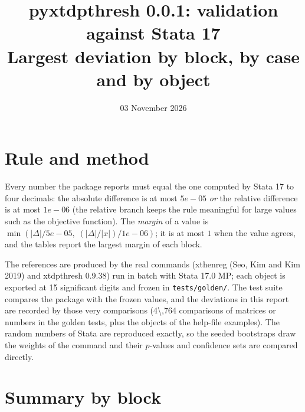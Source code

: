 \documentclass[10.5pt,a4paper]{article}
\title{\textbf{pyxtdpthresh 0.0.1: validation against Stata 17}\\[2pt]\large Largest deviation by block, by case and by object}
\author{}
\date{03 November 2026}
\newcommand{\code}[1]{\texttt{#1}}
\begin{document}
\maketitle

\section{Rule and method}

Every number the package reports must equal the one computed by Stata 17 to four
decimals: the absolute difference is at most $5e-05$ \emph{or} the relative difference is at
most $1e-06$ (the relative branch keeps the rule meaningful for large values such as the
objective function). The \emph{margin} of a value is $\min(|\Delta|/5e-05,\;
(|\Delta|/|x|)/1e-06)$; it is at most $1$ when the value agrees, and the tables report the
largest margin of each block.

The references are produced by the real commands (xthenreg (Seo, Kim and Kim 2019) and xtdpthresh 0.9.38) run in batch with Stata 17.0 MP;
each object is exported at 15 significant digits and frozen in \code{tests/golden/}. The test
suite compares the package with the frozen values, and the deviations in this report are recorded
by those very comparisons (4\textbackslash{},764 comparisons of matrices or numbers in the golden tests, plus the
objects of the help-file examples). The random numbers of Stata are reproduced exactly, so the
seeded bootstraps draw the weights of the command and their $p$-values and confidence sets are
compared directly.

\section{Summary by block}
\end{document}
